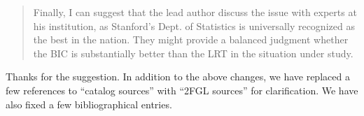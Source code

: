 \documentclass{article}
\newenvironment{referee}
{\begin{quote}\color{red}}
  {\end{quote}}
\newenvironment{reply}
  {}
  {}
\begin{document}
\begin{referee}
Finally, I can suggest that the lead author discuss the issue with experts
at his institution, as Stanford's Dept. of Statistics is universally
recognized as the best in the nation. They might provide a balanced
judgment whether the BIC is substantially better than the LRT in the
situation under study.
\end{referee}


\begin{reply}
Thanks for the suggestion.  In addition to the above changes, we have
replaced a few references to ``catalog sources'' with ``2FGL sources''
for clarification. We have also fixed a few bibliographical entries. 
\end{reply}
\end{document}
